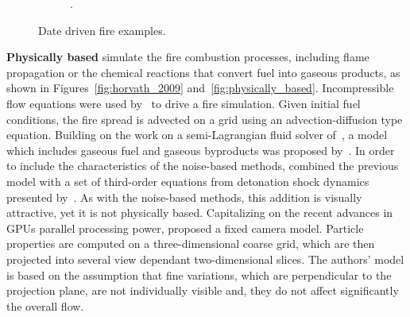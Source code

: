 \begin{figure}[htpb!]
\begin{subfigure}[t]{0.38\textwidth}
                \caption{\cite{Zhang:2011}.}
        \end{subfigure}                   
        \caption{Date driven fire examples.}
        \label{fig:data_driven}
\end{figure}

\textbf{Physically based} simulate the fire combustion processes, including flame propagation or the chemical reactions that convert fuel into gaseous products, as shown in Figures~\ref{fig:horvath_2009} and~\ref{fig:physically_based}.  
Incompressible flow equations were used by~\cite{Stam:1995} to drive a fire simulation.
Given initial fuel conditions, the fire spread is advected on a grid using an advection-diffusion type equation.
Building on the work on a semi-Lagrangian fluid solver of~\cite{Stam:1999}, a model which includes gaseous fuel and gaseous byproducts was proposed by~\cite{Nguyen:2002}.
In order to include the characteristics of the noise-based methods, \cite{Hong:2007} combined the previous model with a set of third-order equations from detonation shock dynamics presented by~\cite{Yao:1996}.
As with the noise-based methods, this addition is visually attractive, yet it is not physically based. 
Capitalizing on the recent advances in GPUs parallel processing power, \cite{Horvath:2009} proposed a fixed camera model.
Particle properties are computed on a three-dimensional coarse grid, which are then projected into several view dependant two-dimensional slices.
The authors' model is based on the assumption that fine variations, which are perpendicular to the projection plane, are not individually visible and, they do not affect significantly the overall flow.


